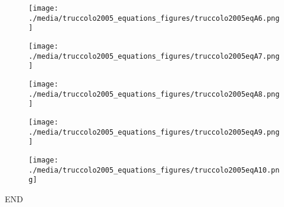 \documentclass[svgnames,13pt]{beamer}
\begin{document}
\begin{frame}{}
\begin{figure}\centering\texttt{[image: ./media/truccolo2005\_equations\_figures/truccolo2005eqA6.png]}\\\end{figure}
\end{frame} 

\begin{frame}{}
\begin{figure}\centering\texttt{[image: ./media/truccolo2005\_equations\_figures/truccolo2005eqA7.png]}\\\end{figure}
\end{frame} 

\begin{frame}{}
\begin{figure}\centering\texttt{[image: ./media/truccolo2005\_equations\_figures/truccolo2005eqA8.png]}\\\end{figure}
\end{frame} 

\begin{frame}{}
\begin{figure}\centering\texttt{[image: ./media/truccolo2005\_equations\_figures/truccolo2005eqA9.png]}\\\end{figure}
\end{frame} 

\begin{frame}{}
\begin{figure}\centering\texttt{[image: ./media/truccolo2005\_equations\_figures/truccolo2005eqA10.png]}\\\end{figure}
\end{frame} 

\begin{frame}{}
END
\end{frame} 
\end{document}

